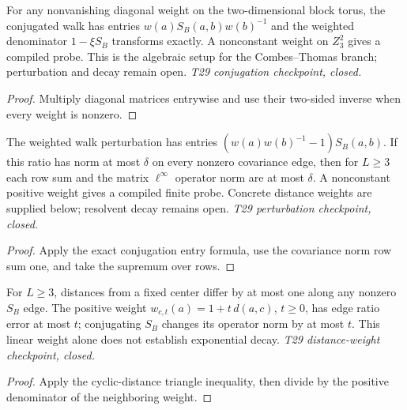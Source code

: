 \begin{lemma}
  \label{lem:combes-thomas-conjugation}
  \leanok
  For any nonvanishing diagonal weight on the two-dimensional block
  torus, the conjugated walk has entries $w(a)S_B(a,b)w(b)^{-1}$ and
  the weighted denominator $1-\xi S_B$ transforms exactly. A nonconstant
  weight on $Z_3^2$ gives a compiled probe. This is the algebraic setup
  for the Combes--Thomas branch; perturbation and decay remain open.
  \emph{T29 conjugation checkpoint, closed.}
\end{lemma}
\begin{proof}\leanok
  Multiply diagonal matrices entrywise and use their two-sided inverse
  when every weight is nonzero.
\end{proof}

\begin{lemma}
  \label{lem:combes-thomas-perturbation}
  \leanok
  The weighted walk perturbation has entries
  $(w(a)w(b)^{-1}-1)S_B(a,b)$. If this ratio has norm at most $\delta$
  on every nonzero covariance edge, then for $L\geq3$ each row sum
  and the matrix $\ell^\infty$ operator norm are at most $\delta$.
  A nonconstant positive weight gives a compiled finite probe.
  Concrete distance weights are supplied below; resolvent decay remains open.
  \emph{T29 perturbation checkpoint, closed.}
\end{lemma}
\begin{proof}\leanok
  Apply the exact conjugation entry formula, use the covariance norm
  row sum one, and take the supremum over rows.
\end{proof}

\begin{lemma}
  \label{lem:combes-thomas-distance-weight}
  \leanok
  For $L\geq3$, distances from a fixed center differ by at most one
  along any nonzero $S_B$ edge. The positive weight
  $w_{c,t}(a)=1+t\,d(a,c)$, $t\geq0$, has edge ratio error at most $t$;
  conjugating $S_B$ changes its operator norm by at most $t$.
  This linear weight alone does not establish exponential decay.
  \emph{T29 distance-weight checkpoint, closed.}
\end{lemma}
\begin{proof}\leanok
  Apply the cyclic-distance triangle inequality, then divide by the
  positive denominator of the neighboring weight.
\end{proof}

